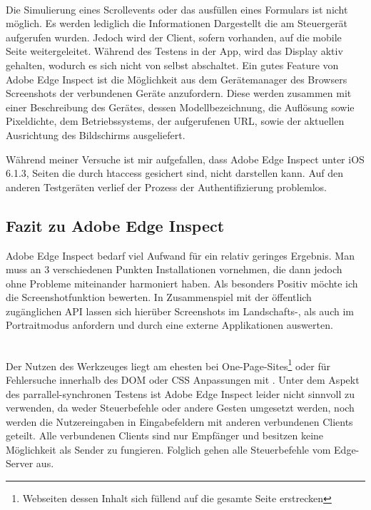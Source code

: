 		\\Die Simulierung eines Scrollevents oder das ausfüllen eines Formulars ist nicht möglich. Es werden lediglich die 				Informationen Dargestellt die am Steuergerät aufgerufen wurden. Jedoch wird der Client, sofern vorhanden, auf die mobile 		Seite weitergeleitet. Während des Testens in der App, wird das Display aktiv gehalten, wodurch es sich nicht von selbst 			abschaltet. Ein gutes Feature von Adobe Edge Inspect ist die Möglichkeit aus dem Gerätemanager des Browsers 				Screenshots der verbundenen Geräte anzufordern. Diese werden zusammen mit einer Beschreibung des Gerätes, dessen 		Modellbezeichnung, die Auflösung sowie Pixeldichte, dem Betriebssystems, der aufgerufenen URL, sowie der aktuellen 			Ausrichtung des Bildschirms ausgeliefert.
		
		Während meiner Versuche ist mir aufgefallen, dass Adobe Edge Inspect unter iOS 6.1.3, Seiten die durch htaccess 				gesichert sind, nicht darstellen kann. Auf den anderen Testgeräten verlief der Prozess der Authentifizierung problemlos. 
		
		\pagebreak
		\subsection{Fazit zu Adobe Edge Inspect}
		Adobe Edge Inspect bedarf viel Aufwand für ein relativ geringes Ergebnis. Man muss an 3 verschiedenen Punkten 				Installationen vornehmen, die dann jedoch \mbox{ohne} Probleme miteinander harmoniert haben. Als besonders Positiv möchte ich 		die Screenshotfunktion bewerten. In Zusammenspiel mit der öffentlich zugänglichen API lassen sich hierüber Screenshots 		im Landschafts-, als auch im Portraitmodus anfordern und durch eine externe Applikationen auswerten. 
		
		\\Der Nutzen des Werkzeuges liegt am ehesten bei One-Page-Sites\footnote{Webseiten dessen Inhalt sich füllend auf die 			gesamte Seite erstrecken} oder für Fehlersuche innerhalb des DOM oder CSS Anpassungen mit . Unter dem 		Aspekt 	des parrallel-synchronen Testens ist Adobe Edge Inspect leider nicht sinnvoll zu verwenden, da weder 				Steuerbefehle oder 		andere Gesten umgesetzt werden, noch werden die Nutzereingaben in Eingabefeldern mit 			anderen verbundenen Clients geteilt. 	Alle verbundenen Clients sind nur Empfänger und besitzen keine Möglichkeit 			als 			Sender zu fungieren. Folglich gehen alle 			Steuerbefehle vom Edge-Server aus.
	
